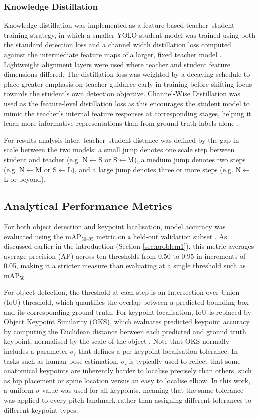 \subsubsection{Knowledge Distillation}
Knowledge distillation was implemented as a feature based teacher--student training strategy, in which a smaller YOLO student model was trained using both the standard detection loss and a channel width distillation loss computed against the intermediate feature maps of a larger, fixed teacher model \cite{Kaleem2024ACR}. Lightweight alignment layers were used where teacher and student feature dimensions differed. The distillation loss was weighted by a decaying schedule to place greater emphasis on teacher guidance early in training before shifting focus towards the student's own detection objective. Channel-Wise Distillation was used as the feature-level distillation loss as this encourages the student model to mimic the teacher's internal feature responses at corresponding stages, helping it learn more informative representations than from ground-truth labels alone  \cite{Kaleem2024ACR, make5040083}.

For results analysis later, teacher--student distance was defined by the gap in scale between the two models: a small jump denotes one scale step between student and teacher (e.g. N$\leftarrow$S or S$\leftarrow$M), a medium jump denotes two steps (e.g. N$\leftarrow$M or S$\leftarrow$L), and a large jump denotes three or more steps (e.g. N$\leftarrow$L or beyond).


 \subsection{Analytical Performance Metrics}

For both object detection and keypoint localisation, model accuracy was evaluated using the $\mathrm{mAP}_{50\text{--}95}$ metric on a held-out validation subset \cite{Everingham2010}. As discussed earlier in the introduction (Section \ref{sec:problem1}), this metric averages average precision (AP) across ten thresholds from 0.50 to 0.95 in increments of 0.05, making it a stricter measure than evaluating at a single threshold such as $\mathrm{mAP}_{50}$.

For object detection, the threshold at each step is an Intersection over Union (IoU) threshold, which quantifies the overlap between a predicted bounding box and its corresponding ground truth. For keypoint localisation, IoU is replaced by Object Keypoint Similarity (OKS), which evaluates predicted keypoint accuracy by computing the Euclidean distance between each predicted and ground truth keypoint, normalised by the scale of the object \cite{Everingham2010}. Note that OKS normally includes a parameter $\sigma_i$ that defines a per-keypoint localisation tolerance. In tasks such as human pose estimation, $\sigma_i$ is typically used to reflect that some anatomical keypoints are inherently harder to localise precisely than others, such as hip placement or spine location versus an easy to localise elbow. In this work, a uniform $\sigma$ value was used for all keypoints, meaning that the same tolerance was applied to every pitch landmark rather than assigning different tolerances to different keypoint types. 

